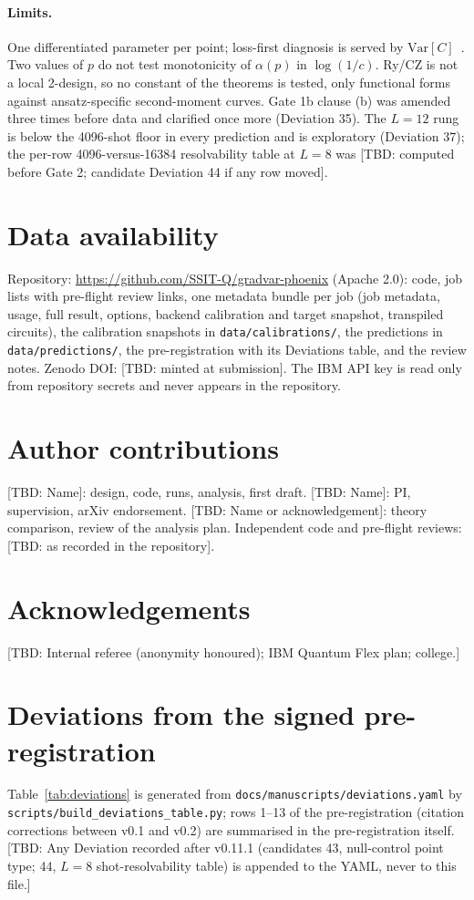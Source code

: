 \documentclass[aps,prxquantum,reprint,superscriptaddress,nofootinbib,longbibliography,amsmath,amssymb]{revtex4-2}
\newcommand{\tbd}[1]{\textcolor{orange!80!black}{[TBD: #1]}}
\newcommand{\Var}{\mathrm{Var}}
\begin{document}
\paragraph{Limits.} One differentiated parameter per point; loss-first diagnosis is served by $\Var[C]$~\cite{Larocca2025,Arrasmith2022}. Two values of $p$ do not test monotonicity of $\alpha(p)$ in $\log(1/c)$. Ry/CZ is not a local 2-design, so no constant of the theorems is tested, only functional forms against ansatz-specific second-moment curves. Gate 1b clause (b) was amended three times before data and clarified once more (Deviation 35). The $L = 12$ rung is below the 4096-shot floor in every prediction and is exploratory (Deviation 37); the per-row 4096-versus-16384 resolvability table at $L = 8$ was \tbd{computed before Gate 2; candidate Deviation 44 if any row moved}.

\section*{Data availability}
Repository: \url{https://github.com/SSIT-Q/gradvar-phoenix} (Apache 2.0): code, job lists with pre-flight review links, one metadata bundle per job (job metadata, usage, full result, options, backend calibration and target snapshot, transpiled circuits), the calibration snapshots in \texttt{data/calibrations/}, the predictions in \texttt{data/predictions/}, the pre-registration with its Deviations table, and the review notes. Zenodo DOI: \tbd{minted at submission}. The IBM API key is read only from repository secrets and never appears in the repository.

\section*{Author contributions}
\tbd{Name}: design, code, runs, analysis, first draft. \tbd{Name}: PI, supervision, arXiv endorsement. \tbd{Name or acknowledgement}: theory comparison, review of the analysis plan. Independent code and pre-flight reviews: \tbd{as recorded in the repository}.

\section*{Acknowledgements}
\tbd{Internal referee (anonymity honoured); IBM Quantum Flex plan; college.}

\appendix

\section{Deviations from the signed pre-registration}\label{app:deviations}
Table~\ref{tab:deviations} is generated from \texttt{docs/manuscripts/deviations.yaml} by \texttt{scripts/build\_deviations\_table.py}; rows 1--13 of the pre-registration (citation corrections between v0.1 and v0.2) are summarised in the pre-registration itself. \tbd{Any Deviation recorded after v0.11.1 (candidates 43, null-control point type; 44, $L = 8$ shot-resolvability table) is appended to the YAML, never to this file.}
\onecolumngrid

\twocolumngrid
\end{document}
